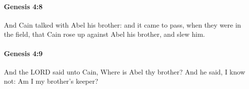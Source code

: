 		\paragraph{Genesis 4:8} %
			\label{GENESIS-4-8}

			And Cain talked with Abel his brother: and it came to pass, when they were in the field, that Cain rose up against Abel his brother, and slew him.


		\paragraph{Genesis 4:9} %
			\label{GENESIS-4-9}

			And the LORD said unto Cain, Where is Abel thy brother? And he said, I know not: Am I my brother's keeper?


